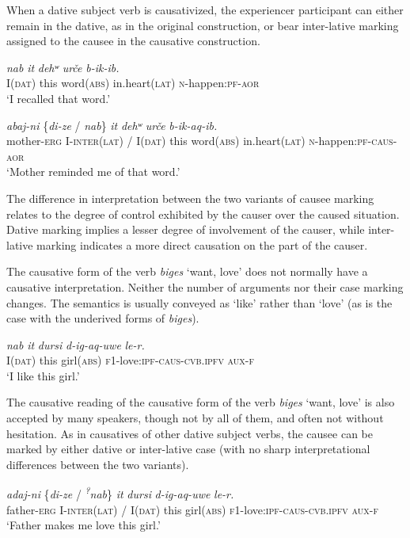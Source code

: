 ﻿\documentclass[output=paper]{langsci/langscibook}
\begin{document}
When a dative subject verb is causativized, the experiencer participant
can either remain in the dative, as in the original construction, or
bear inter-lative marking assigned to the causee in the causative
construction.

\ea %
\ea %
\gll \emph{nab} \emph{it} \emph{dehʷ} \emph{urče} \emph{b-ik-ib.}\\
I(\textsc{dat}) {this} word(\textsc{abs}) in.heart(\textsc{lat}) \textsc{n}-happen:\textsc{pf}-\textsc{aor}\\
\glt `I recalled that word.'

\ex %
\gll \emph{abaj-ni} \{\emph{di-ze} / \emph{nab}\} \emph{it} \emph{dehʷ} \emph{urče} \emph{b-ik-aq-ib.}\\
mother-\textsc{erg} I-\textsc{inter(lat)} / I(\textsc{dat}) {this} word(\textsc{abs}) in.heart(\textsc{lat}) \textsc{n}-happen:\textsc{pf}-\textsc{caus}-\textsc{aor}\\
\glt `Mother reminded me of that word.'
\z
\z

The difference in interpretation between the two variants of causee
marking relates to the degree of control exhibited by the causer over
the caused situation. Dative marking implies a lesser degree of
involvement of the causer, while inter-lative marking indicates a
more direct causation on the part of the causer.

The causative form of the verb \emph{biges} `want, love' does not
normally have a causative interpretation. Neither the number of
arguments nor their case marking changes. The semantics is usually
conveyed as `like' rather than `love' (as is the case with the underived
forms of \emph{biges}).

\ea %
\gll \emph{nab} \emph{it} \emph{dursi} \emph{d-ig-aq-uwe} \emph{le-r.}\\
I(\textsc{dat}) {this} girl(\textsc{abs}) \textsc{f1}-love:\textsc{ipf}-\textsc{caus}-\textsc{cvb.ipfv} \textsc{aux}-\textsc{f}\\
\glt `I like this girl.'
\z

The causative reading of the causative form of the verb \emph{biges}
`want, love' is also accepted by many speakers, though not by all of
them, and often not without hesitation. As in causatives of other dative
subject verbs, the causee can be marked by either dative or inter-lative
case (with no sharp interpretational differences between the two
variants).

\ea %
\gll \emph{adaj-ni} \{\emph{di-ze} / \emph{\textsuperscript{?}nab}\} \emph{it} \emph{dursi} \emph{d-ig-aq-uwe} \emph{le-r.}\\
father-\textsc{erg} I-\textsc{inter(lat)} / I(\textsc{dat}) {this} girl(\textsc{abs})
\textsc{f1}-love:\textsc{ipf}-\textsc{caus}-\textsc{cvb.ipfv} \textsc{aux}-\textsc{f}\\
\glt `Father makes me love this girl.'
\z
\end{document}
